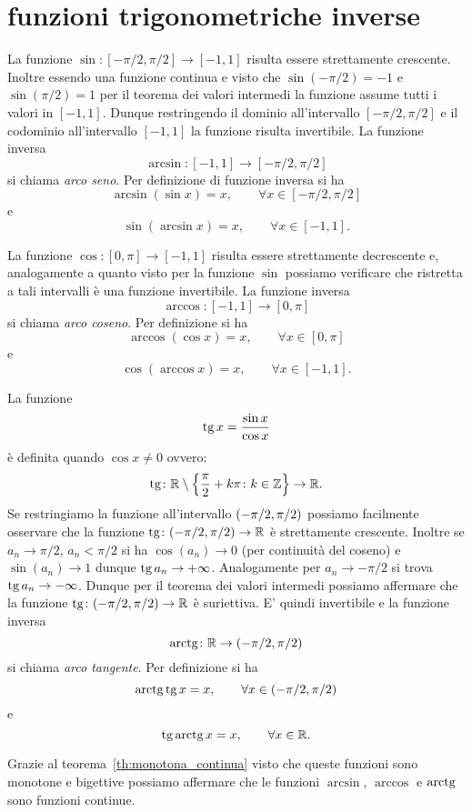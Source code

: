 \section{funzioni trigonometriche inverse}
La funzione $\sin\colon[-\pi/2,\pi/2]\to [-1,1]$ risulta essere strettamente crescente. Inoltre essendo una funzione continua e visto che $\sin(-\pi/2)=-1$
e $\sin(\pi/2) = 1$ per il  teorema dei valori intermedi
la funzione assume tutti i valori in $[-1,1]$.
Dunque restringendo il dominio all'intervallo $[-\pi/2, \pi/2]$
e il codominio all'intervallo $[-1,1]$ la funzione risulta invertibile.
La funzione inversa
\[
  \arcsin\colon[-1,1]\to [-\pi/2, \pi/2]
\]
si chiama \emph{arco seno}. Per definizione di funzione inversa si ha
\[
  \arcsin(\sin x) = x, \qquad \forall x \in [-\pi/2, \pi/2]
\]
e
\[
  \sin(\arcsin x) = x, \qquad \forall x \in [-1, 1].
\]

La funzione $\cos \colon[0,\pi] \to [-1,1]$ risulta essere strettamente
decrescente e, analogamente a quanto visto per la funzione $\sin$
possiamo verificare che ristretta a tali intervalli è una funzione invertibile.
La funzione inversa
\[
  \arccos\colon[-1,1] \to [0,\pi]
\]
si chiama \emph{arco coseno}. Per definizione si ha
\[
  \arccos(\cos x) = x, \qquad \forall x \in [0,\pi]
\]
e
\[
    \cos(\arccos x) = x, \qquad \forall x \in [-1,1].
\]

La funzione
%
\[
\operatorname{tg} x = \frac{\sin x}{\cos x}
\]
è definita quando $\cos x\neq 0$ ovvero:
\[
  \operatorname{tg} \colon {\mathbb R} \setminus{\left\{ \frac \pi 2+ k\pi\colon k\in {\mathbb Z}\right\}} \to {\mathbb R}.
\]
Se restringiamo la funzione all'intervallo ${\left( -\pi/2, \pi/2 \right)}$ possiamo
facilmente osservare che la funzione $\operatorname{tg}\colon(-\pi/2,\pi/2)\to {\mathbb R}$ è strettamente crescente. Inoltre se $a_n \to \pi/2$, $a_n<\pi/2$ si ha $\cos(a_n)\to 0$ (per continuità del coseno) e $\sin(a_n)\to 1$ dunque $\operatorname{tg} a_n\to +\infty$. Analogamente per $a_n \to -\pi/2$ si trova $\operatorname{tg} a_n \to -\infty$. Dunque per il teorema dei valori intermedi possiamo affermare che la funzione $\operatorname{tg}\colon(-\pi/2,\pi/2)\to {\mathbb R}$ è suriettiva. E' quindi invertibile
e la funzione inversa
\[
  \operatorname{arctg} \colon {\mathbb R} \to (-\pi/2,\pi/2)
\]
si chiama \emph{arco tangente}. Per definizione si ha
\[
  \operatorname{arctg} \operatorname{tg} x = x, \qquad \forall x \in (-\pi/2, \pi/2)
\]
e
\[
  \operatorname{tg}\operatorname{arctg} x = x, \qquad \forall x \in {\mathbb R}.
\]

Grazie al teorema~\ref{th:monotona_continua}
visto che queste funzioni sono monotone e bigettive
possiamo affermare che
le funzioni $\arcsin$, $\arccos$ e $\operatorname{arctg}$ sono funzioni continue.


